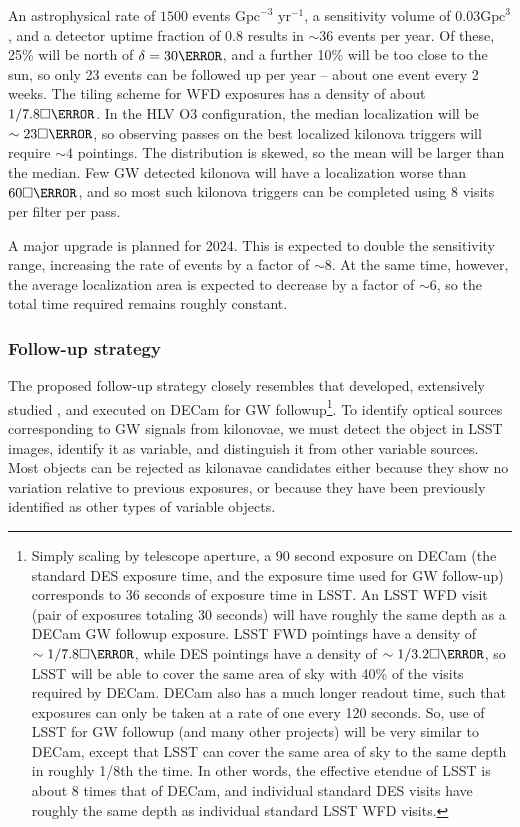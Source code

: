 An astrophysical rate of $1500$ events $\mbox{Gpc}^{-3}$ $\mbox{yr}^{-1}$, a sensitivity volume of $0.03 \mbox{Gpc}^3$, and a detector uptime fraction of $0.8$ results in $\sim 36$ events per year. Of these, 25\% will be north of $\delta=30\degree$, and a further 10\% will be too close to the sun, so only 23 events can be followed up per year -- about one event every 2 weeks. The tiling scheme for WFD exposures has a density of about $1/7.8\square\degree$. In the HLV O3 configuration, the median localization will be $\sim 23 \square\degree$, so observing passes on the best localized kilonova triggers will require $\sim 4$ pointings. The distribution is skewed, so the mean will be larger than the median. Few GW detected kilonova will have a localization worse than $60 \square \degree$, and so most such kilonova triggers can be completed using 8 visits per filter per pass.

A major upgrade is planned for 2024. This is expected to double the sensitivity range, increasing the rate of events by a factor of $\sim8$. At the same time, however, the average localization area is expected to decrease by a factor of $\sim6$, so the total time required remains roughly constant.


\subsubsection{Follow-up strategy}

The proposed follow-up strategy closely resembles that developed, extensively studied , and executed  on DECam for GW followup\footnote{Simply scaling by telescope aperture, a 90 second exposure on DECam (the standard DES exposure time, and the exposure time used for GW follow-up) corresponds to 36 seconds of exposure time in LSST. An LSST WFD visit (pair of exposures totaling 30 seconds) will have roughly the same depth as a DECam GW followup exposure. LSST FWD pointings have a density of $\sim 1/7.8\square\degree$, while DES pointings have a density of $\sim 1/3.2\square\degree$, so LSST will be able to cover the same area of sky with 40\% of the visits required by DECam.  DECam also has a much longer readout time, such that exposures can only be taken at a rate of one every 120 seconds. So, use of LSST for GW followup (and many other projects) will be very similar to DECam, except that LSST can cover the same area of sky to the same depth in roughly 1/8th the time. In other words, the effective etendue of LSST is about 8 times that of DECam, and individual standard DES visits have roughly the same depth as individual standard LSST WFD visits.}. To identify optical sources corresponding to GW signals from kilonovae, we must detect the object in LSST images, identify it as variable, and distinguish it from other variable sources. Most objects can be rejected as kilonavae candidates either because they show no variation relative to previous exposures, or because they have been previously identified as other types of variable objects.

